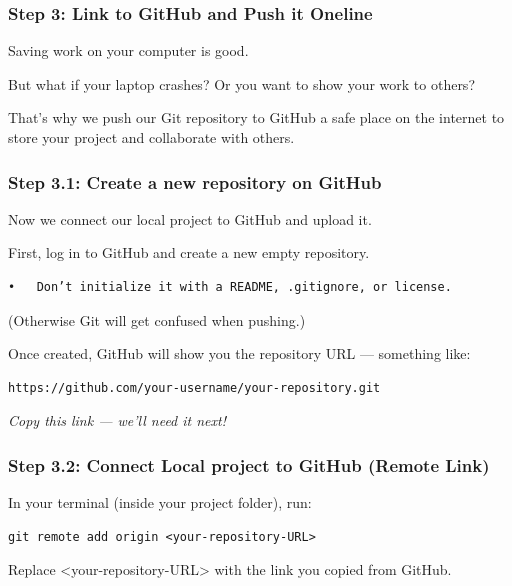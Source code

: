 \documentclass[
  11pt,
  a4paper,
]{article}
\begin{document}
\newpage

\subsubsection{Step 3: Link to GitHub and Push it
Oneline}\label{step-3-link-to-github-and-push-it-oneline}

Saving work on your computer is good.

But what if your laptop crashes? Or you want to show your work to
others?

That's why we push our Git repository to GitHub a safe place on the
internet to store your project and collaborate with others.

\subsubsection{Step 3.1: Create a new repository on
GitHub}\label{step-3.1-create-a-new-repository-on-github}

Now we connect our local project to GitHub and upload it.

First, log in to GitHub and create a new empty repository.

\begin{verbatim}
•   Don’t initialize it with a README, .gitignore, or license.
\end{verbatim}

(Otherwise Git will get confused when pushing.)

Once created, GitHub will show you the repository URL --- something
like:

\begin{verbatim}
https://github.com/your-username/your-repository.git
\end{verbatim}

\emph{Copy this link --- we'll need it next!}

\subsubsection{Step 3.2: Connect Local project to GitHub (Remote
Link)}\label{step-3.2-connect-local-project-to-github-remote-link}

In your terminal (inside your project folder), run:

\begin{verbatim}
git remote add origin <your-repository-URL>
\end{verbatim}

Replace \textless your-repository-URL\textgreater{} with the link you
copied from GitHub.\\
\end{document}
